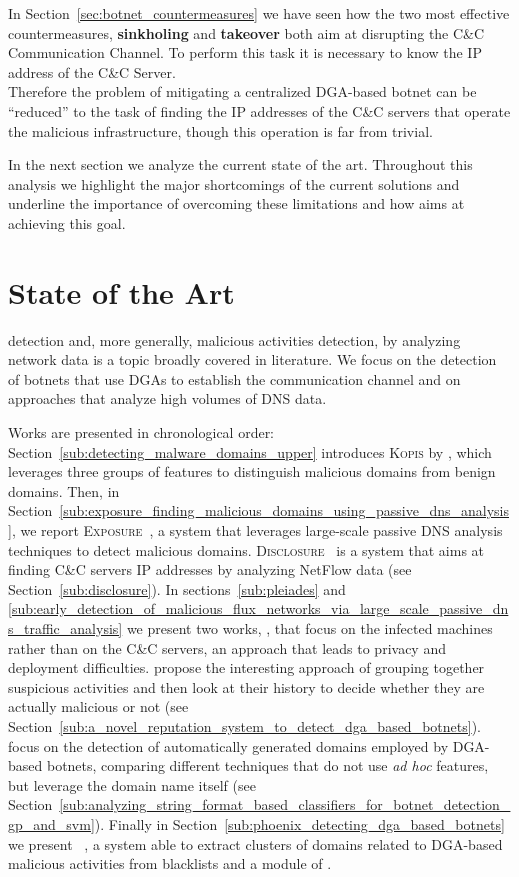 In Section~\ref{sec:botnet_countermeasures} we have seen how the two most effective
countermeasures, \textbf{sinkholing} and \textbf{takeover} both aim at disrupting
the C\&C Communication Channel. To perform this task it is necessary to know the IP
address of the C\&C Server.\\
Therefore the problem of mitigating a centralized DGA-based botnet can be ``reduced''
to the task of finding the IP addresses of the C\&C servers that operate the
malicious infrastructure, though this operation is far from trivial.

In the next section we analyze the current state of the art.
Throughout this analysis we highlight the major shortcomings of the current
solutions and underline the importance of overcoming these limitations and
how \thesystem aims at achieving this goal.


\section{State of the Art} %
\label{sec:state_of_the_art}
 detection and, more generally, malicious activities
detection, by analyzing network data is a topic broadly covered in literature.
We focus on the detection of botnets that use DGAs to establish the
communication channel and on approaches that analyze high volumes of DNS data.

Works are presented in chronological order: Section~\ref{sub:detecting_malware_domains_upper} introduces \textsc{Kopis} by \citet{antonakakis2011}, which leverages three groups of features to distinguish
malicious domains from benign domains. Then, in Section~\ref{sub:exposure_finding_malicious_domains_using_passive_dns_analysis}, we report \textsc{Exposure}~\cite{bilge2011exposure}, a system that leverages large-scale passive DNS analysis
techniques to detect malicious domains.
\textsc{Disclosure}~\cite{bilge2012} is a system that aims at finding C\&C servers IP addresses by analyzing NetFlow data (see Section~\ref{sub:disclosure}).
In sections~\ref{sub:pleiades} and \ref{sub:early_detection_of_malicious_flux_networks_via_large_scale_passive_dns_traffic_analysis} we present two works, \cite{perdisci2012} \cite{antonakakis2012}, that
focus on the infected machines rather than on the C\&C servers, an approach that
leads to privacy and deployment difficulties. \citet{sharifnya2013} propose the
interesting approach of grouping together suspicious activities and then look
at their history to decide whether they are actually malicious or not (see Section~\ref{sub:a_novel_reputation_system_to_detect_dga_based_botnets}). \citet{haddadi2013malicious} focus on the detection of automatically generated domains
employed by DGA-based botnets, comparing different techniques that do not use
\emph{ad hoc} features, but leverage the domain name itself (see Section~\ref{sub:analyzing_string_format_based_classifiers_for_botnet_detection_gp_and_svm}). Finally in Section~\ref{sub:phoenix_detecting_dga_based_botnets} we present
\phoenix~\cite{schiavoni2013}, a system able to extract clusters of domains
related to DGA-based malicious activities from blacklists and a module
of \thesystem.


